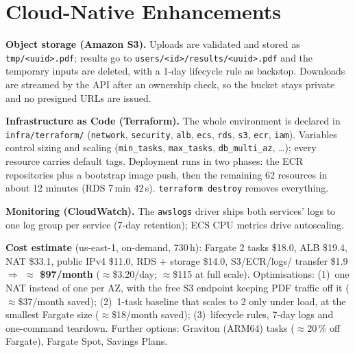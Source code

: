 \documentclass[11pt,a4paper]{article}
\begin{document}
\section{Cloud-Native Enhancements}
\textbf{Object storage (Amazon S3).} Uploads are validated and stored as
\texttt{tmp/<uuid>.pdf}; results go to \texttt{users/<id>/results/<uuid>.pdf}
and the temporary inputs are deleted, with a 1-day lifecycle rule as backstop.
Downloads are streamed by the API after an ownership check, so the bucket
stays private and no presigned URLs are issued.

\textbf{Infrastructure as Code (Terraform).} The whole environment is declared
in \texttt{infra/terraform/} (\texttt{network}, \texttt{security},
\texttt{alb}, \texttt{ecs}, \texttt{rds}, \texttt{s3}, \texttt{ecr},
\texttt{iam}). Variables control sizing and scaling (\texttt{min\_tasks},
\texttt{max\_tasks}, \texttt{db\_multi\_az}, \ldots); every resource carries
default tags. Deployment runs in two phases: the ECR repositories plus a
bootstrap image push, then the remaining 62 resources in about 12 minutes
(RDS 7\,min 42\,s). \texttt{terraform destroy} removes everything.

\textbf{Monitoring (CloudWatch).} The \texttt{awslogs} driver ships both
services' logs to one log group per service (7-day
retention); ECS CPU metrics
drive autoscaling.

\textbf{Cost estimate} (us-east-1, on-demand, 730\,h): Fargate 2 tasks \$18.0,
ALB \$19.4, NAT \$33.1, public IPv4 \$11.0, RDS + storage \$14.0, S3/ECR/logs/
transfer \$1.9 $\Rightarrow$ \textbf{$\approx$ \$97/month} ($\approx$\$3.20/day;
$\approx$\$115 at full scale). Optimisations: (1)~one NAT instead of one per
AZ, with the free S3 endpoint keeping PDF traffic off it ($\approx$\$37/month
saved); (2)~1-task baseline that scales to 2 only under load, at the smallest
Fargate size ($\approx$\$18/month saved); (3)~lifecycle rules, 7-day logs and
one-command teardown. Further options: Graviton (ARM64) tasks ($\approx$20\,\%
off Fargate), Fargate Spot, Savings Plans.

\end{document}
